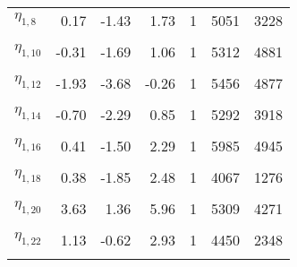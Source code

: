 \begin{longtable}[t]{lrrrrrr}
$\eta_{1, 8}$ & 0.17 & -1.43 & 1.73 & 1 & 5051 & 3228\\
\cellcolor{gray!6}{$\eta_{1, 9}$} & \cellcolor{gray!6}{-0.46} & \cellcolor{gray!6}{-3.14} & \cellcolor{gray!6}{1.94} & \cellcolor{gray!6}{1} & \cellcolor{gray!6}{5276} & \cellcolor{gray!6}{4483}\\
$\eta_{1, 10}$ & -0.31 & -1.69 & 1.06 & 1 & 5312 & 4881\\
\cellcolor{gray!6}{$\eta_{1, 11}$} & \cellcolor{gray!6}{-0.83} & \cellcolor{gray!6}{-2.18} & \cellcolor{gray!6}{0.53} & \cellcolor{gray!6}{1} & \cellcolor{gray!6}{5170} & \cellcolor{gray!6}{2888}\\
$\eta_{1, 12}$ & -1.93 & -3.68 & -0.26 & 1 & 5456 & 4877\\
\cellcolor{gray!6}{$\eta_{1, 13}$} & \cellcolor{gray!6}{1.17} & \cellcolor{gray!6}{-0.25} & \cellcolor{gray!6}{2.65} & \cellcolor{gray!6}{1} & \cellcolor{gray!6}{5876} & \cellcolor{gray!6}{4898}\\
$\eta_{1, 14}$ & -0.70 & -2.29 & 0.85 & 1 & 5292 & 3918\\
\cellcolor{gray!6}{$\eta_{1, 15}$} & \cellcolor{gray!6}{0.00} & \cellcolor{gray!6}{-2.24} & \cellcolor{gray!6}{2.17} & \cellcolor{gray!6}{1} & \cellcolor{gray!6}{6210} & \cellcolor{gray!6}{4838}\\
$\eta_{1, 16}$ & 0.41 & -1.50 & 2.29 & 1 & 5985 & 4945\\
\cellcolor{gray!6}{$\eta_{1, 17}$} & \cellcolor{gray!6}{1.32} & \cellcolor{gray!6}{-0.32} & \cellcolor{gray!6}{2.99} & \cellcolor{gray!6}{1} & \cellcolor{gray!6}{5967} & \cellcolor{gray!6}{5379}\\
$\eta_{1, 18}$ & 0.38 & -1.85 & 2.48 & 1 & 4067 & 1276\\
\cellcolor{gray!6}{$\eta_{1, 19}$} & \cellcolor{gray!6}{1.76} & \cellcolor{gray!6}{0.10} & \cellcolor{gray!6}{3.44} & \cellcolor{gray!6}{1} & \cellcolor{gray!6}{5302} & \cellcolor{gray!6}{5240}\\
$\eta_{1, 20}$ & 3.63 & 1.36 & 5.96 & 1 & 5309 & 4271\\
\cellcolor{gray!6}{$\eta_{1, 21}$} & \cellcolor{gray!6}{-0.30} & \cellcolor{gray!6}{-2.40} & \cellcolor{gray!6}{1.65} & \cellcolor{gray!6}{1} & \cellcolor{gray!6}{4736} & \cellcolor{gray!6}{1994}\\
$\eta_{1, 22}$ & 1.13 & -0.62 & 2.93 & 1 & 4450 & 2348\\
\cellcolor{gray!6}{$\eta_{1, 23}$} & \cellcolor{gray!6}{1.29} & \cellcolor{gray!6}{-0.59} & \cellcolor{gray!6}{3.27} & \cellcolor{gray!6}{1} & \cellcolor{gray!6}{5678} & \cellcolor{gray!6}{5057}\\

\end{longtable}
